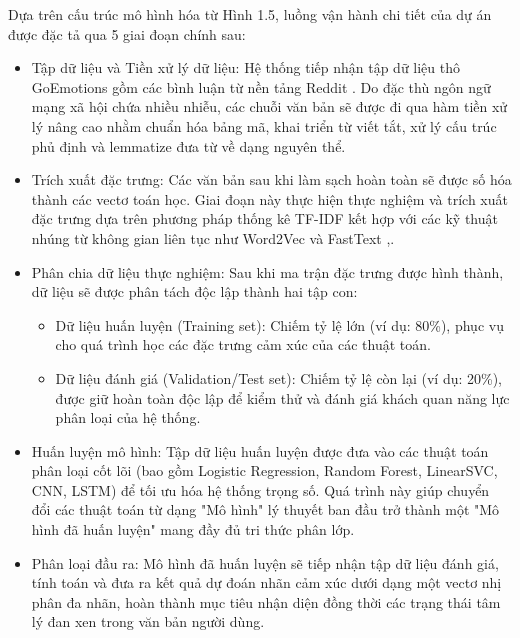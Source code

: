 Dựa trên cấu trúc mô hình hóa từ Hình 1.5, luồng vận hành chi tiết của dự án được đặc tả qua 5 giai đoạn chính sau:
\begin{itemize}
\item Tập dữ liệu và Tiền xử lý dữ liệu: Hệ thống tiếp nhận tập dữ liệu thô GoEmotions gồm các bình luận từ nền tảng Reddit \cite{demszky2020goemotions}. Do đặc thù ngôn ngữ mạng xã hội chứa nhiều nhiễu, các chuỗi văn bản sẽ được đi qua hàm tiền xử lý nâng cao nhằm chuẩn hóa bảng mã, khai triển từ viết tắt, xử lý cấu trúc phủ định và lemmatize đưa từ về dạng nguyên thể.

\item Trích xuất đặc trưng: Các văn bản sau khi làm sạch hoàn toàn sẽ được số hóa thành các vectơ toán học. Giai đoạn này thực hiện thực nghiệm và trích xuất đặc trưng dựa trên phương pháp thống kê TF-IDF kết hợp với các kỹ thuật nhúng từ không gian liên tục như Word2Vec và FastText \cite{singh2018natural},\cite{mikolov2013efficient}.

\item Phân chia dữ liệu thực nghiệm: Sau khi ma trận đặc trưng được hình thành, dữ liệu sẽ được phân tách độc lập thành hai tập con:
\begin{itemize}
\item[$\circ$] Dữ liệu huấn luyện (Training set): Chiếm tỷ lệ lớn (ví dụ: 80\%), phục vụ cho quá trình học các đặc trưng cảm xúc của các thuật toán.

\item[$\circ$] Dữ liệu đánh giá (Validation/Test set): Chiếm tỷ lệ còn lại (ví dụ: 20\%), được giữ hoàn toàn độc lập để kiểm thử và đánh giá khách quan năng lực phân loại của hệ thống.
\end{itemize}
\item Huấn luyện mô hình: Tập dữ liệu huấn luyện được đưa vào các thuật toán phân loại cốt lõi (bao gồm Logistic Regression, Random Forest, LinearSVC, CNN, LSTM) để tối ưu hóa hệ thống trọng số. Quá trình này giúp chuyển đổi các thuật toán từ dạng "Mô hình" lý thuyết ban đầu trở thành một "Mô hình đã huấn luyện" mang đầy đủ tri thức phân lớp.

\item Phân loại đầu ra: Mô hình đã huấn luyện sẽ tiếp nhận tập dữ liệu đánh giá, tính toán và đưa ra kết quả dự đoán nhãn cảm xúc dưới dạng một vectơ nhị phân đa nhãn, hoàn thành mục tiêu nhận diện đồng thời các trạng thái tâm lý đan xen trong văn bản người dùng.
\end{itemize}


